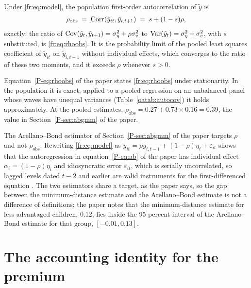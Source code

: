 Under \eqref{fr:eq:model}, the population first-order autocorrelation of
$\tilde y$ is
\begin{equation}
\rho_{\mathrm{obs}} \;=\; \mathrm{Corr}(\tilde y_{it}, \tilde y_{i,t+1}) \;=\; s + (1-s)\rho,
\label{fr:eq:rhoobs}
\end{equation}
exactly: the ratio of $\mathrm{Cov}(\tilde y_t, \tilde y_{t+1}) = \sigma^2_\eta + \rho\sigma^2_v$ to
$\mathrm{Var}(\tilde y_t) = \sigma^2_\eta + \sigma^2_v$, with $s$ substituted, is \eqref{fr:eq:rhoobs}.
It is the probability limit of the pooled least squares coefficient of
$\tilde y_{it}$ on $\tilde y_{i,t-1}$ without individual effects, which converges
to the ratio of these two moments, and it exceeds $\rho$ whenever $s > 0$.

Equation~\eqref{P-eq:rhoobs} of the paper states \eqref{fr:eq:rhoobs} under stationarity. In the population it is exact; applied to a pooled regression on an unbalanced panel whose waves have unequal variances (Table~\ref{oatab:autocov}) it holds approximately. At the
pooled estimates, $\rho_{\mathrm{obs}} = 0.27 + 0.73 \times 0.16 = 0.39$,
the value in Section~\ref{P-sec:abgmm} of the paper.

The Arellano--Bond estimator of Section~\ref{P-sec:abgmm} of the paper
targets $\rho$ and not $\rho_{\mathrm{obs}}$. Rewriting
\eqref{fr:eq:model} as
$\tilde y_{it} = \rho\tilde y_{i,t-1} + (1-\rho)\eta_i + \varepsilon_{it}$
shows that the autoregression in equation~\eqref{P-eq:ab} of the paper
has individual effect $\alpha_i = (1-\rho)\eta_i$ and idiosyncratic error
$\varepsilon_{it}$, which is serially uncorrelated, so lagged levels dated
$t-2$ and earlier are valid instruments for the first-differenced
equation \citep{ArellanoBond1991}. The two estimators share a target, as
the paper says, so the gap between the minimum-distance estimate and the
Arellano--Bond estimate is not a difference of definitions; the paper notes that the minimum-distance estimate for less advantaged children, 0.12, lies inside the 95 percent interval of the Arellano--Bond estimate for that group, $[-0.01, 0.13]$.

\section{The accounting identity for the premium}
\label{fr:sec:identity}

